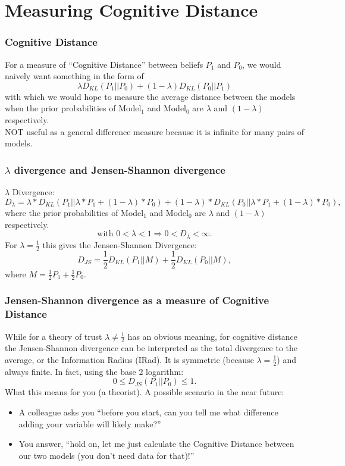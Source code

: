 \documentclass{beamer}
\begin{document}
\section{Measuring Cognitive Distance}
\begin{frame}
\frametitle{Cognitive Distance}
For a measure of ``Cognitive Distance'' between beliefs $P_1$ and $P_0$, we would naively want something in the form of
$$\lambda D_{KL}(P_1 | | P_0) + (1-\lambda) D_{KL}(P_0 | | P_1)$$
with which we would hope to measure the average distance between the models when the prior probabilities of Model$_1$ and Model$_0$ are $\lambda$ and $(1-\lambda)$ respectively.\\
NOT useful as a general difference measure because it is infinite for many pairs of models.
\end{frame}
\begin{frame}
\frametitle{$\lambda$ divergence and Jensen-Shannon divergence}
$\lambda$ Divergence:
$$D_{\lambda}=\lambda * D_{KL}(P_1 | | \lambda * P_1 + (1-\lambda) * P_0) + (1-\lambda) * D_{KL}(P_0 | | \lambda * P_1 + (1-\lambda) * P_0),$$
where the prior probabilities of Model$_1$ and Model$_0$ are $\lambda$ and $(1-\lambda)$ respectively.
$$\text{with } 0<\lambda<1  \Rightarrow 0<D_{\lambda}<\infty.$$
For $\lambda=\frac{1}{2}$ this gives the Jensen-Shannon Divergence:
$$D_{JS}=\frac{1}{2} D_{KL}(P_1 | | M) + \frac{1}{2} D_{KL}(P_0 | | M),$$
where $M = \frac{1}{2} P_1 + \frac{1}{2} P_0$.
\end{frame}
\begin{frame}
\frametitle{Jensen-Shannon divergence as a measure of Cognitive Distance}
While for a theory of trust $\lambda \not=\frac{1}{2}$ has an obvious meaning, for cognitive distance the Jensen-Shannon divergence can be interpreted as the total divergence to the average, or the Information Radius (IRad).  It is symmetric (because $\lambda=\frac{1}{2}$) and always finite. In fact, using the base 2 logarithm:
$$0 \leq D_{JS}(P_1 || P_0)\leq 1.$$
What this means for you (a theorist). A possible scenario in the near future:
\begin{itemize}
\item A colleague asks you ``before you start, can you tell me what difference adding your variable will likely make?''
\item You answer, ``hold on, let me just calculate the Cognitive Distance between our two models (you don't need data for that)!''
\end{itemize}
\end{frame}
\end{document}
